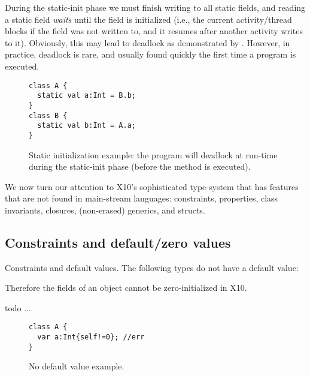 During the static-init phase we must finish writing to all static fields,
    and reading a static field \emph{waits} until the field is initialized
    (i.e., the current activity/thread blocks if the field was not written to,
    and it resumes after another activity writes to it).
Obviously, this may lead to deadlock as demonstrated by .
However, in practice, deadlock is rare,
    and usually found quickly the first time a program is executed.

\begin{figure}
\begin{lstlisting}
class A {
  static val a:Int = B.b;
}
class B {
  static val b:Int = A.a;
}
\end{lstlisting}
\caption{Static initialization example:
    the program will deadlock at run-time
    during the static-init phase (before the  method is executed).
    }
\label{Figure:Static-init}
\end{figure}





We now turn our attention to X10's sophisticated type-system
    that has features that are not found in main-stream languages:
    constraints, properties, class invariants, closures, (non-erased) generics, and structs.

\subsection{Constraints and default/zero values}
Constraints and default values.
The following types do not have a default value:

Therefore the fields of an object cannot be zero-initialized in X10.

 todo ...

\begin{figure}
\begin{lstlisting}
class A {
  var a:Int{self!=0}; //err
}
\end{lstlisting}
\caption{No default value example.
    }
\label{Figure:Constraints}
\end{figure}


